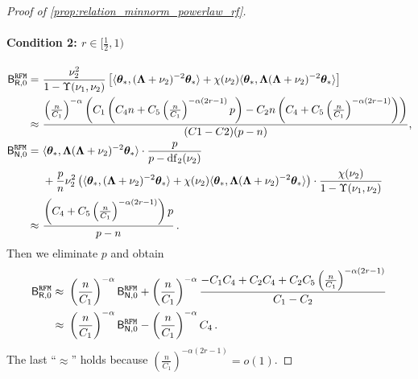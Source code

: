 \begin{proof}[Proof of \cref{prop:relation_minnorm_powerlaw_rf}]
\paragraph{Condition 2: $r \in [\frac{1}{2}, 1)$}
\[
\begin{aligned}
\mathsf B_{\mathsf R,0}^{\tt RFM} =&~ \frac{\nu_2^2}{1 - \Upsilon(\nu_1, \nu_2)} \left[ \langle {\boldsymbol \theta}_*, ({\boldsymbol \Lambda} + \nu_2)^{-2} {\boldsymbol \theta}_* \rangle + \chi(\nu_2) \langle {\boldsymbol \theta}_*, {\boldsymbol \Lambda} ({\boldsymbol \Lambda} + \nu_2)^{-2} {\boldsymbol \theta}_* \rangle \right]\\
\approx&~\frac{\left(\frac{n}{C_1}\right)^{-\alpha}\left(C_1\left(C_4 n + C_5 \left(\frac{n}{C_1}\right)^{-\alpha (2r-1)} p\right)-C_2 n \left(C_4 + C_5 \left(\frac{n}{C_1}\right)^{-\alpha (2r-1)}\right)\right)}{(C1-C2)(p-n)},\\
\mathsf B_{\mathsf N,0}^{\tt RFM} =&~ \langle {\boldsymbol \theta}_*, {\boldsymbol \Lambda} ( {\boldsymbol \Lambda} + \nu_2)^{-2} {\boldsymbol \theta}_* \rangle \cdot \frac{p}{p - {\rm df}_2(\nu_2)}\\
&~+ \frac{p}{n} \nu_2^2 \left( \langle {\boldsymbol \theta}_*, ({\boldsymbol \Lambda} + \nu_2)^{-2} {\boldsymbol \theta}_* \rangle + \chi(\nu_2) \langle {\boldsymbol \theta}_*, {\boldsymbol \Lambda} ({\boldsymbol \Lambda} + \nu_2)^{-2} {\boldsymbol \theta}_* \rangle \right) \cdot \frac{\chi(\nu_2)}{1 - \Upsilon(\nu_1, \nu_2)}\\
\approx&~ \frac{\left(C_4+C_5\left(\frac{n}{C_1}\right)^{-\alpha(2r-1)}\right)p}{p-n}\,.
\end{aligned}
\]
Then we eliminate $p$ and obtain
\[
\begin{aligned}
\mathsf B_{\mathsf R,0}^{\tt RFM} \approx&~ \left(\frac{n}{C_1}\right)^{-\alpha} \mathsf B_{\mathsf N,0}^{\tt RFM} + \left(\frac{n}{C_1}\right)^{-\alpha}\frac{-C_1C_4+C_2C_4+C_2C_5\left(\frac{n}{C_1}\right)^{-\alpha(2r-1)}}{C_1-C_2}\\
\approx&~ \left(\frac{n}{C_1}\right)^{-\alpha} \mathsf B_{\mathsf N,0}^{\tt RFM} - \left(\frac{n}{C_1}\right)^{-\alpha}C_4\,.
\end{aligned}
\]
The last ``$\approx$'' holds because $\left(\frac{n}{C_1}\right)^{-\alpha(2r-1)} = o(1)$.


\end{proof}
